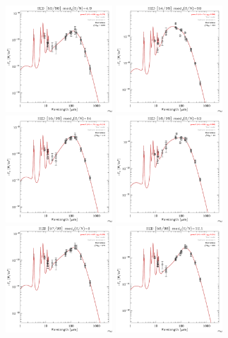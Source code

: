\documentclass[preprint2,longabstract]{aastex}
\begin{document}
\begin{figure}
    \includegraphics[trim=0 2mm 0 0, clip, width=40mm]{../SEDs/sed_53.pdf}
	\includegraphics[trim=0 2mm 0 0, clip, width=40mm]{../SEDs/sed_54.pdf}
	\includegraphics[trim=0 2mm 0 0, clip, width=40mm]{../SEDs/sed_55.pdf}
	\includegraphics[trim=0 2mm 0 0, clip, width=40mm]{../SEDs/sed_56.pdf}
	\includegraphics[trim=0 2mm 0 0, clip, width=40mm]{../SEDs/sed_57.pdf}
	\includegraphics[trim=0 2mm 0 0, clip, width=40mm]{../SEDs/sed_58.pdf}

\end{figure}
\end{document}
